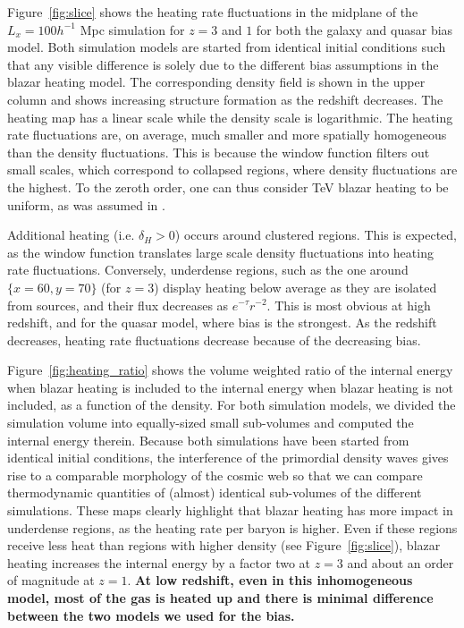 \documentclass[numberedappendix]{emulateapj}
\newcommand\Ec[1]{{\color{magenta} \bf #1}} %
\begin{document}
Figure~\ref{fig:slice} shows the heating rate fluctuations in the midplane of the $L_x=100h^{-1}$ Mpc simulation for $z=3$ and $1$ for both the galaxy and quasar bias model. Both simulation models are started from identical initial conditions such that any visible difference is solely due to the different bias assumptions in the blazar heating model. The corresponding density field is shown in the upper column and shows increasing structure formation as the redshift decreases. The heating map has a linear scale while the density scale is logarithmic. The heating rate fluctuations are, on average, much smaller and more spatially homogeneous than the density fluctuations. This is because the window function filters out small scales, which correspond to collapsed regions, where density fluctuations are the highest. To the zeroth order, one can thus consider TeV blazar heating to be uniform, as was assumed in \citet{2012ApJ...752...23C}.

Additional heating (i.e. $\delta_H>0$) occurs around clustered regions. This is expected, as the window function translates large scale density fluctuations into heating rate fluctuations. Conversely, underdense regions, such as the one around $\{x=60,y=70\}$ (for $z=3$) display heating below average as they are isolated from sources, and their flux decreases as \Ec{$e^{-\tau} r^{-2}$}. This is most obvious at high redshift, and for the quasar model, where bias is the strongest. As the redshift decreases, heating rate fluctuations decrease because of the decreasing bias.

Figure~\ref{fig:heating_ratio} shows the volume weighted ratio of the internal energy when blazar heating is included to the internal energy when blazar heating is not included, as a function of the density. For both simulation models, we divided the simulation volume into equally-sized small sub-volumes and computed the internal energy therein. Because both simulations have been started from identical initial conditions, the interference of the primordial density waves gives rise to a comparable morphology of the cosmic web so that we can compare thermodynamic quantities of (almost) identical sub-volumes of the different simulations. These maps clearly highlight that blazar heating has more impact in underdense regions, as the heating rate per baryon is higher. Even if these regions receive less heat than regions with higher density (see Figure~\ref{fig:slice}),  blazar heating increases the internal energy by a factor two at $z=3$ and about an order of magnitude at $z=1$. \Ec{At low redshift, even in this inhomogeneous model, most of the gas is heated up and there is minimal difference between the two models we used for the bias.}
\end{document}

